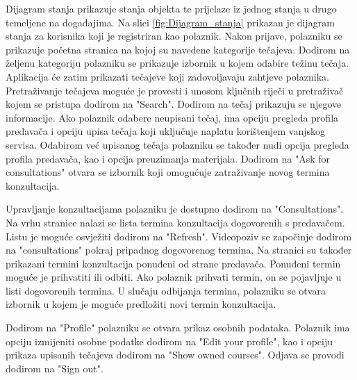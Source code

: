 			
			Dijagram stanja prikazuje stanja objekta te prijelaze iz jednog stanja u drugo temeljene na događajima. Na slici \ref{fig:Dijagram_stanja} prikazan je dijagram stanja za korisnika koji je registriran kao polaznik. Nakon prijave, polazniku se prikazuje početna stranica na kojoj su navedene kategorije tečajeva. Dodirom na željenu kategoriju polazniku se prikazuje izbornik u kojem odabire težinu tečaja. Aplikacija će zatim prikazati tečajeve koji zadovoljavaju zahtjeve polaznika. Pretraživanje tečajeva moguće je provesti i unosom ključnih riječi u pretraživač kojem se pristupa dodirom na "Search". Dodirom na tečaj prikazuju se njegove informacije. Ako polaznik odabere neupisani tečaj, ima opciju pregleda profila predavača i opciju upisa tečaja koji uključuje naplatu korištenjem vanjskog servisa. Odabirom već upisanog tečaja polazniku se također nudi opcija pregleda profila predavača, kao i opcija preuzimanja materijala. Dodirom na "Ask for consultations" otvara se izbornik koji omogućuje zatraživanje novog termina konzultacija.
			
			Upravljanje konzultacijama polazniku je dostupno dodirom na "Consultations". Na vrhu stranice nalazi se lista termina konzultacija dogovorenih s predavačem. Listu je moguće osvježiti dodirom na "Refresh". Videopoziv se započinje dodirom na "consultations" pokraj pripadnog dogovorenog termina. Na stranici su također prikazani termini konzultacija ponuđeni od strane predavača. Ponuđeni termin moguće je prihvatiti ili odbiti. Ako polaznik prihvati termin, on se pojavljuje u listi dogovorenih termina. U slučaju odbijanja termina, polazniku se otvara izbornik u kojem je moguće predložiti novi termin konzultacija.
			
			Dodirom na "Profile" polazniku se otvara prikaz osobnih podataka. Polaznik ima opciju izmijeniti osobne podatke dodirom na "Edit your profile", kao i opciju prikaza upisanih tečajeva dodirom na "Show owned courses". Odjava se provodi dodirom na "Sign out".
			
			\eject
			

